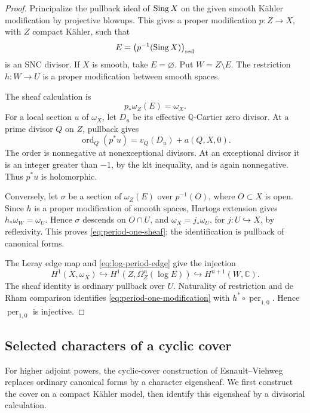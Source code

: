\documentclass[11pt,a4paper]{article}
\numberwithin{equation}{section}
\theoremstyle{definition}
\theoremstyle{remark}
\newcommand{\Q}{\mathbb Q}\newcommand{\R}{\mathbb R}
\newcommand{\C}{\mathbb C}\newcommand{\Z}{\mathbb Z}
\newcommand{\ord}{\operatorname{ord}}\newcommand{\per}{\operatorname{per}}
\begin{document}
\begin{proof}
Principalize the pullback ideal of $\operatorname{Sing} X$ on the given smooth Kähler
modification by projective blowups. This gives a proper modification
$p:Z\to X$, with $Z$ compact Kähler, such that
\[
 E=\bigl(p^{-1}(\operatorname{Sing} X)\bigr)_{\mathrm{red}}
\]
is an SNC divisor. If $X$ is smooth, take $E=\varnothing$. Put
$W=Z\setminus E$. The restriction $h:W\to U$ is a proper modification
between smooth spaces.

The sheaf calculation is
\begin{equation}\label{eq:period-one-sheaf}
 p_*\omega_Z(E)=\omega_X.
\end{equation}
For a local section $u$ of $\omega_X$, let $D_u$ be its effective
$\Q$-Cartier zero divisor. At a prime divisor $Q$ on $Z$, pullback gives
\[
 \ord_Q(p^*u)=v_Q(D_u)+a(Q,X,0).
\]
The order is nonnegative at nonexceptional divisors. At an exceptional
divisor it is an integer greater than $-1$, by the klt inequality, and
is again nonnegative. Thus $p^*u$ is holomorphic.

Conversely, let $\sigma$ be a section of $\omega_Z(E)$ over $p^{-1}(O)$,
where $O\subset X$ is open. Since $h$ is a proper modification of smooth
spaces, Hartogs extension gives $h_*\omega_W=\omega_U$. Hence $\sigma$
descends on $O\cap U$, and
$\omega_X=j_*\omega_U$, for $j:U\hookrightarrow X$, by reflexivity.
This proves \eqref{eq:period-one-sheaf}; the identification is pullback
of canonical forms.

The Leray edge map and \eqref{eq:log-period-edge} give the injection
\begin{equation}\label{eq:period-one-modification}
 H^1(X,\omega_X)\hookrightarrow
 H^1(Z,\Omega_Z^n(\log E))\hookrightarrow H^{n+1}(W,\C).
\end{equation}
The sheaf identity is ordinary pullback over $U$. Naturality of
restriction and de Rham comparison identifies
\eqref{eq:period-one-modification} with $h^*\circ\per_{1,0}$.
Hence $\per_{1,0}$ is injective.
\end{proof}

\subsection{Selected characters of a cyclic cover}

For higher adjoint powers, the cyclic-cover construction of
Esnault--Viehweg \cite[3.5, Corollary~3.11 and Lemma~3.16]{EV1992}
replaces ordinary canonical forms by a character eigensheaf. We first
construct the cover on a compact Kähler model, then identify this
eigensheaf by a divisorial calculation.
\end{document}

